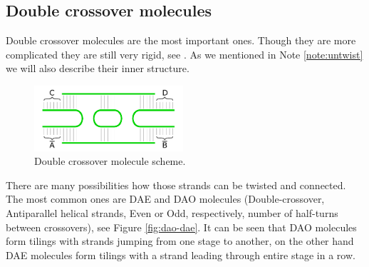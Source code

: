 	\subsection{Double crossover molecules}
	\label{sec:double_crossover}
		
		Double crossover molecules are the most important ones. Though they are more complicated they are still very rigid, see \cite{seeman93}. As we mentioned in Note \ref{note:untwist} we will also describe their inner structure. %
		
		\begin{figure}[h]
		\begin{center}
			\includegraphics[width=0.492\textwidth]{./figures/strand_types/double_crossover.pdf}
			\caption{Double crossover molecule scheme.}
			\label{fig:double_crossover}
		\end{center}
		\end{figure}
		
		There are many possibilities how those strands can be twisted and connected. The most common ones are DAE and DAO molecules (Double-crossover, Antiparallel helical strands, Even or Odd, respectively, number of half-turns between crossovers), see Figure \ref{fig:dao-dae}. It can be seen that DAO molecules form tilings with strands jumping from one stage to another, on the other hand DAE molecules form tilings with a strand leading through entire stage in a row.
		

